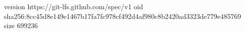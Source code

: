 version https://git-lfs.github.com/spec/v1
oid sha256:8cc45d8e149e1467b17fa7fc978cf492d4af980c8b2420ad3323de779e485769
size 699236
